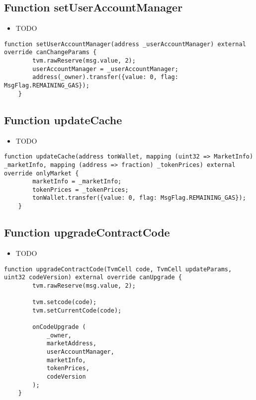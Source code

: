 \subsection{Function setUserAccountManager}

\noindent\begin{itemize}
\item TODO
\end{itemize}

\begin{lstlisting}[firstnumber=71]
    function setUserAccountManager(address _userAccountManager) external override canChangeParams {
        tvm.rawReserve(msg.value, 2);
        userAccountManager = _userAccountManager;
        address(_owner).transfer({value: 0, flag: MsgFlag.REMAINING_GAS});
    }
\end{lstlisting}

\subsection{Function updateCache}

\noindent\begin{itemize}
\item TODO
\end{itemize}

\begin{lstlisting}[firstnumber=81]
    function updateCache(address tonWallet, mapping (uint32 => MarketInfo) _marketInfo, mapping (address => fraction) _tokenPrices) external override onlyMarket {
        marketInfo = _marketInfo;
        tokenPrices = _tokenPrices;
        tonWallet.transfer({value: 0, flag: MsgFlag.REMAINING_GAS});
    }
\end{lstlisting}

\subsection{Function upgradeContractCode}

\noindent\begin{itemize}
\item TODO
\end{itemize}

\begin{lstlisting}[firstnumber=23]
    function upgradeContractCode(TvmCell code, TvmCell updateParams, uint32 codeVersion) external override canUpgrade {
        tvm.rawReserve(msg.value, 2);

        tvm.setcode(code);
        tvm.setCurrentCode(code);

        onCodeUpgrade (
            _owner,
            marketAddress,
            userAccountManager,
            marketInfo,
            tokenPrices,
            codeVersion
        );
    }
\end{lstlisting}

